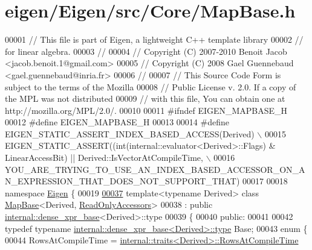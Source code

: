 \hypertarget{eigen_2_eigen_2src_2_core_2_map_base_8h_source}{}\section{eigen/\+Eigen/src/\+Core/\+Map\+Base.h}
\label{eigen_2_eigen_2src_2_core_2_map_base_8h_source}

\begin{DoxyCode}
00001 \textcolor{comment}{// This file is part of Eigen, a lightweight C++ template library}
00002 \textcolor{comment}{// for linear algebra.}
00003 \textcolor{comment}{//}
00004 \textcolor{comment}{// Copyright (C) 2007-2010 Benoit Jacob <jacob.benoit.1@gmail.com>}
00005 \textcolor{comment}{// Copyright (C) 2008 Gael Guennebaud <gael.guennebaud@inria.fr>}
00006 \textcolor{comment}{//}
00007 \textcolor{comment}{// This Source Code Form is subject to the terms of the Mozilla}
00008 \textcolor{comment}{// Public License v. 2.0. If a copy of the MPL was not distributed}
00009 \textcolor{comment}{// with this file, You can obtain one at http://mozilla.org/MPL/2.0/.}
00010 
00011 \textcolor{preprocessor}{#ifndef EIGEN\_MAPBASE\_H}
00012 \textcolor{preprocessor}{#define EIGEN\_MAPBASE\_H}
00013 
00014 \textcolor{preprocessor}{#define EIGEN\_STATIC\_ASSERT\_INDEX\_BASED\_ACCESS(Derived) \(\backslash\)}
00015 \textcolor{preprocessor}{      EIGEN\_STATIC\_ASSERT((int(internal::evaluator<Derived>::Flags) & LinearAccessBit) ||
       Derived::IsVectorAtCompileTime, \(\backslash\)}
00016 \textcolor{preprocessor}{                         
       YOU\_ARE\_TRYING\_TO\_USE\_AN\_INDEX\_BASED\_ACCESSOR\_ON\_AN\_EXPRESSION\_THAT\_DOES\_NOT\_SUPPORT\_THAT)}
00017 
00018 \textcolor{keyword}{namespace }\hyperlink{namespace_eigen}{Eigen} \{ 
00019 
\hyperlink{group___core___module}{00037} \textcolor{keyword}{template}<\textcolor{keyword}{typename} Derived> \textcolor{keyword}{class }\hyperlink{class_eigen_1_1_map_base}{MapBase}<Derived, \hyperlink{group__enums_gga9f93eac38eb83deb0e8dbd42ddf11d5da42865f87356ad7e585a1bfbfd1b81699}{ReadOnlyAccessors}>
00038   : \textcolor{keyword}{public} \hyperlink{struct_eigen_1_1internal_1_1dense__xpr__base}{internal::dense\_xpr\_base}<Derived>::type
00039 \{
00040   \textcolor{keyword}{public}:
00041 
00042     \textcolor{keyword}{typedef} \textcolor{keyword}{typename} \hyperlink{struct_eigen_1_1internal_1_1dense__xpr__base}{internal::dense\_xpr\_base<Derived>::type} Base;
00043     \textcolor{keyword}{enum} \{
00044       RowsAtCompileTime = \hyperlink{struct_eigen_1_1internal_1_1traits}{internal::traits<Derived>::RowsAtCompileTime}

\end{DoxyCode}
